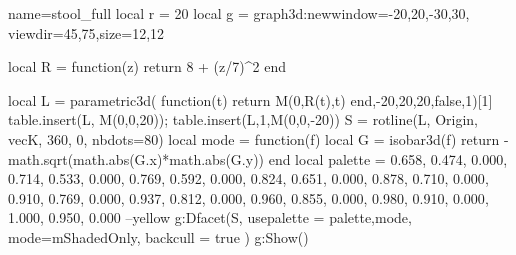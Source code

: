 \documentclass[border=5pt]{standalone}
\begin{document}
\begin{luadraw}{name=stool_full}
local r = 20
local g = graph3d:new{window={-20,20,-30,30}, viewdir={45,75},size={12,12}}

local R = function(z)
    return 8 + (z/7)^2
end

local L = parametric3d( function(t) return M(0,R(t),t) end,-20,20,20,false,1)[1]
table.insert(L, M(0,0,20)); table.insert(L,1,M(0,0,-20))
S = rotline(L, {Origin, vecK}, 360, 0, {nbdots=80})
local mode = function(f)
    local G = isobar3d(f)
    return  -math.sqrt(math.abs(G.x)*math.abs(G.y))
end
local palette = {
  {0.658, 0.474, 0.000}, 
  {0.714, 0.533, 0.000},
  {0.769, 0.592, 0.000},
  {0.824, 0.651, 0.000},
  {0.878, 0.710, 0.000},
  {0.910, 0.769, 0.000},
  {0.937, 0.812, 0.000},
  {0.960, 0.855, 0.000},
  {0.980, 0.910, 0.000},
  {1.000, 0.950, 0.000} } --yellow
g:Dfacet(S, {
    usepalette = {palette,mode},
    mode=mShadedOnly,
    backcull = true
})
g:Show()
\end{luadraw}
\end{document}
